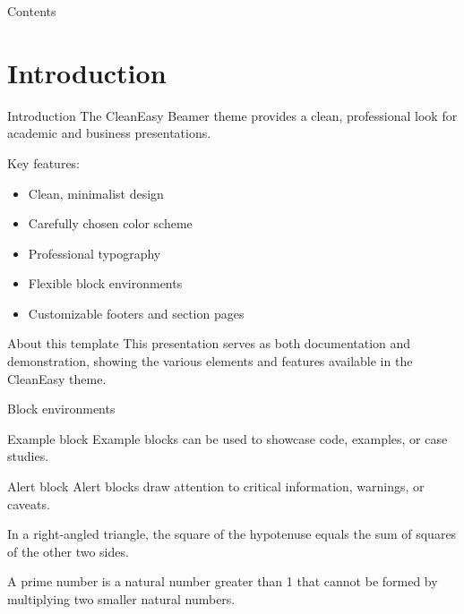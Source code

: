 \documentclass[aspectratio=169,xcolor=dvipsnames]{beamer}
\begin{document}
\begin{frame}[plain]
  \titlepage
\end{frame}

\begin{frame}[plain]{Contents}
  \tableofcontents
\end{frame}

\section{Introduction}
\begin{frame}{Introduction}
  The CleanEasy Beamer theme provides a clean, professional look for academic and business presentations.
  
  \vspace{0.3cm}
  
  Key features:
  \begin{itemize}
    \item Clean, minimalist design
    \item Carefully chosen color scheme
    \item Professional typography
    \item Flexible block environments
    \item Customizable footers and section pages
  \end{itemize}
  
  \begin{block}{About this template}
    This presentation serves as both documentation and demonstration, showing the various elements and features available in the CleanEasy theme.
  \end{block}
\end{frame}

\begin{frame}{Block environments}

  \begin{exampleblock}{Example block}
    Example blocks can be used to showcase code, examples, or case studies.
  \end{exampleblock}
  
  \begin{alertblock}{Alert block}
    Alert blocks draw attention to critical information, warnings, or caveats.
  \end{alertblock}
  
  \begin{theorem}
    In a right-angled triangle, the square of the hypotenuse equals the sum of squares of the other two sides.
  \end{theorem}
  
  \begin{definition}
    A prime number is a natural number greater than 1 that cannot be formed by multiplying two smaller natural numbers.
  \end{definition}
\end{frame}
\end{document}
